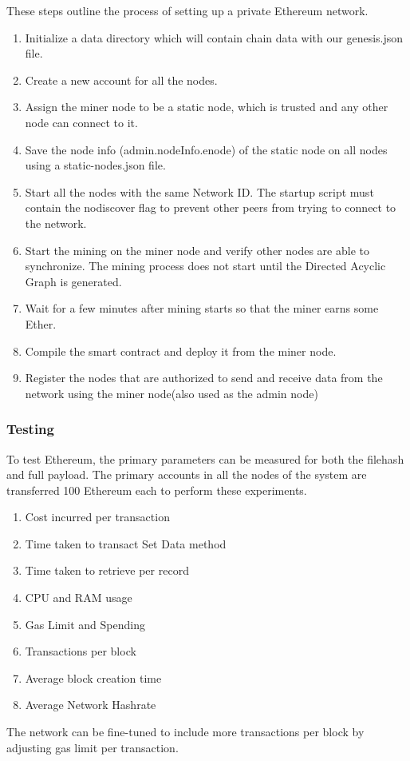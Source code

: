 \documentclass[11pt,openright]{report}
\begin{document}
These steps outline the process of setting up a private Ethereum network.
\begin{enumerate}
    \item Initialize a data directory which will contain chain data with our genesis.json file.
    \item Create a new account for all the nodes.
    \item Assign the miner node to be a static node, which is trusted and any other node can connect to it. 
    \item Save the node info (admin.nodeInfo.enode) of the static node on all nodes using a static-nodes.json file.
    \item Start all the nodes with the same Network ID. The startup script must contain the nodiscover flag to prevent other peers from trying to connect to the network.
    \item Start the mining on the miner node and verify other nodes are able to synchronize. The mining process does not start until the Directed Acyclic Graph is generated. 
    \item Wait for a few minutes after mining starts so that the miner earns some Ether. 
    \item Compile the smart contract and deploy it from the miner node.
    \item Register the nodes that are authorized to send and receive data from the network using the miner node(also used as the admin node)
\end{enumerate}


\subsubsection{Testing}
To test Ethereum, the primary parameters can be measured for both the filehash and full payload. The primary accounts in all the nodes of the system are transferred 100 Ethereum each to perform these experiments. 
\begin{enumerate}
    \item Cost incurred per transaction
    \item Time taken to transact Set Data method
    \item Time taken to retrieve per record
    \item CPU and RAM usage
    \item Gas Limit and Spending
    \item Transactions per block
    \item Average block creation time
    \item Average Network Hashrate
\end{enumerate}
The network can be fine-tuned to include more transactions per block by adjusting gas limit per transaction.
\end{document}
